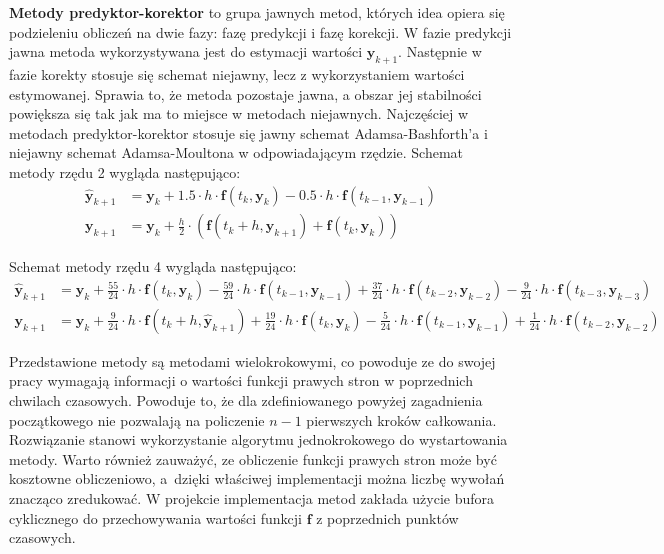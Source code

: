 \textbf{Metody predyktor-korektor} to grupa jawnych metod, których idea opiera się podzieleniu obliczeń na dwie fazy: fazę predykcji i fazę korekcji. W fazie predykcji jawna metoda wykorzystywana jest do estymacji wartości $\bm{y}_{k+1}$. Następnie w fazie korekty stosuje się schemat niejawny, lecz z wykorzystaniem wartości estymowanej. Sprawia to, że metoda pozostaje jawna, a obszar jej stabilności powiększa się tak jak ma to miejsce w metodach niejawnych. Najczęściej w metodach predyktor-korektor stosuje się jawny schemat Adamsa-Bashforth'a i niejawny schemat Adamsa-Moultona w odpowiadającym rzędzie. Schemat metody rzędu 2 wygląda następująco:
\[
	\begin{aligned}
	\bm{\hat{y}}_{k+1} & = \bm{y}_{k} + 1.5 \cdot h \cdot  \bm{f} \left( t_{k}, \bm{y}_{k} \right) - 0.5 \cdot h \cdot  \bm{f} \left( t_{k-1}, \bm{y}_{k-1} \right)\\
	\bm{y}_{k+1} & = \bm{y}_{k} + \frac{h}{2} \cdot  \left( \bm{f} \left( t_{k} + h, \bm{\hat{y}}_{k+1} \right) +  \bm{f} \left( t_{k}, \bm{y}_{k} \right) \right)
	\end{aligned}
\]

Schemat metody rzędu 4 wygląda następująco:
\[
	\begin{aligned}
	\bm{\hat{y}}_{k+1} & = \bm{y}_{k} + \frac{55}{24} \cdot h \cdot  \bm{f} \left( t_{k}, \bm{y}_{k} \right) - \frac{59}{24} \cdot h \cdot  \bm{f} \left( t_{k-1}, \bm{y}_{k-1} \right)  + \frac{37}{24} \cdot h \cdot  \bm{f} \left( t_{k-2}, \bm{y}_{k-2} \right)  - \frac{9}{24} \cdot h \cdot  \bm{f} \left( t_{k-3}, \bm{y}_{k-3} \right) \\
	\bm{y}_{k+1} & = \bm{y}_{k} +   \frac{9}{24} \cdot h \cdot \bm{f} \left( t_{k} + h, \bm{\hat{y}}_{k+1} \right) + \frac{19}{24} \cdot h \cdot  \bm{f} \left( t_{k}, \bm{y}_{k} \right) - \frac{5}{24} \cdot h \cdot  \bm{f} \left( t_{k-1}, \bm{y}_{k-1} \right)  + \frac{1}{24} \cdot h \cdot  \bm{f} \left( t_{k-2}, \bm{y}_{k-2} \right)
	\end{aligned}
\]

Przedstawione metody są metodami wielokrokowymi, co powoduje ze do swojej pracy wymagają informacji o wartości funkcji prawych stron w poprzednich chwilach czasowych. Powoduje to, że dla zdefiniowanego powyżej zagadnienia początkowego nie pozwalają na policzenie $n-1$ pierwszych kroków całkowania. Rozwiązanie stanowi wykorzystanie algorytmu jednokrokowego do wystartowania metody. Warto również zauważyć, ze obliczenie funkcji prawych stron może być kosztowne obliczeniowo, a~dzięki właściwej implementacji można liczbę wywołań znacząco zredukować. W projekcie implementacja metod zakłada użycie bufora cyklicznego do przechowywania wartości funkcji $\bm{f}$ z poprzednich punktów czasowych.

